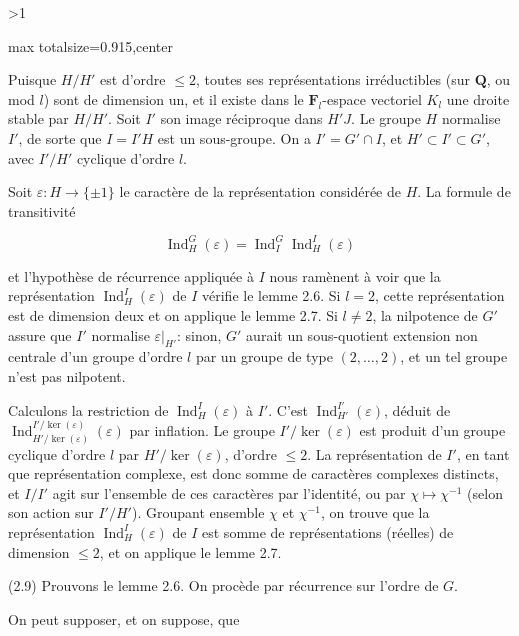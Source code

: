 \documentclass[9pt,twoside]{extarticle}
\newcommand{\EditionPage}[3]{%
  \ifnum#1>1\clearpage\fi
  \pdfbookmark[1]{Printed folio #2}{fr-folio-#2}%
  \hypertarget{fr-page-#1}{}%
  \noindent\begin{adjustbox}{max totalsize={\textwidth}{0.915\textheight},center}
  \begin{minipage}[t]{\textwidth}
  \fontsize{8.45}{10.05}\selectfont\justifying
  #3
  \end{minipage}
  \end{adjustbox}%
}
\begin{document}
\EditionPage{8}{306}{%
Puisque \(H/H'\) est d’ordre \(\leq2\), toutes ses représentations irréductibles (sur \(\mathbf Q\), ou mod \(l\)) sont de dimension un, et il existe dans le \(\mathbf F_l\)-espace vectoriel \(K_l\) une droite stable par \(H/H'\). Soit \(I'\) son image réciproque dans \(H'J\). Le groupe \(H\) normalise \(I'\), de sorte que \(I=I'H\) est un sous-groupe. On a \(I'=G'\cap I\), et \(H'\subset I'\subset G'\), avec \(I'/H'\) cyclique d’ordre \(l\).\par

Soit \(\varepsilon:H\to\{\pm1\}\) le caractère de la représentation considérée de \(H\). La formule de transitivité\par

\[
\operatorname{Ind}_H^G(\varepsilon)=\operatorname{Ind}_I^G\operatorname{Ind}_H^I(\varepsilon)
\]

et l’hypothèse de récurrence appliquée à \(I\) nous ramènent à voir que la représentation \(\operatorname{Ind}_H^I(\varepsilon)\) de \(I\) vérifie le lemme 2.6. Si \(l=2\), cette représentation est de dimension deux et on applique le lemme 2.7. Si \(l\neq2\), la nilpotence de \(G'\) assure que \(I'\) normalise \(\varepsilon|_{H'}\): sinon, \(G'\) aurait un sous-quotient extension non centrale d’un groupe d’ordre \(l\) par un groupe de type \((2,\ldots,2)\), et un tel groupe n’est pas nilpotent.\par

Calculons la restriction de \(\operatorname{Ind}_H^I(\varepsilon)\) à \(I'\). C’est \(\operatorname{Ind}_{H'}^{I'}(\varepsilon)\), déduit de \(\operatorname{Ind}_{H'/\ker(\varepsilon)}^{I'/\ker(\varepsilon)}(\varepsilon)\) par inflation. Le groupe \(I'/\ker(\varepsilon)\) est produit d’un groupe cyclique d’ordre \(l\) par \(H'/\ker(\varepsilon)\), d’ordre \(\leq2\). La représentation de \(I'\), en tant que représentation complexe, est donc somme de caractères complexes distincts, et \(I/I'\) agit sur l’ensemble de ces caractères par l’identité, ou par \(\chi\mapsto\chi^{-1}\) (selon son action sur \(I'/H'\)). Groupant ensemble \(\chi\) et \(\chi^{-1}\), on trouve que la représentation \(\operatorname{Ind}_H^I(\varepsilon)\) de \(I\) est somme de représentations (réelles) de dimension \(\leq2\), et on applique le lemme 2.7.\par

(2.9) Prouvons le lemme 2.6. On procède par récurrence sur l’ordre de \(G\).\par

On peut supposer, et on suppose, que\par

}
\end{document}
